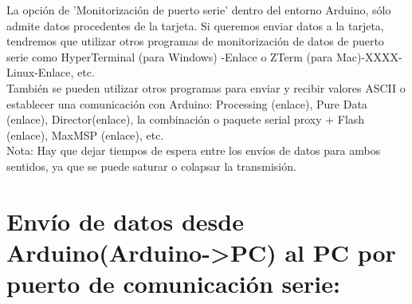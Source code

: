 La opción de 'Monitorización de puerto serie' dentro del entorno Arduino, sólo admite datos procedentes de la tarjeta. Si queremos enviar datos a la tarjeta, tendremos que utilizar otros programas de monitorización de datos de puerto serie como HyperTerminal (para Windows) -Enlace o ZTerm (para Mac)-XXXX- Linux-Enlace, etc.\\
También se pueden utilizar otros programas para enviar y recibir valores ASCII o establecer una comunicación con Arduino: Processing (enlace), Pure Data (enlace), Director(enlace), la combinación o paquete serial proxy + Flash (enlace), MaxMSP (enlace), etc.\\
Nota: Hay que dejar tiempos de espera entre los envíos de datos para ambos sentidos, ya que se puede saturar o colapsar la transmisión.\\
\newpage{}
\section{Envío de datos desde Arduino(Arduino->PC) al PC por puerto de comunicación serie:}


